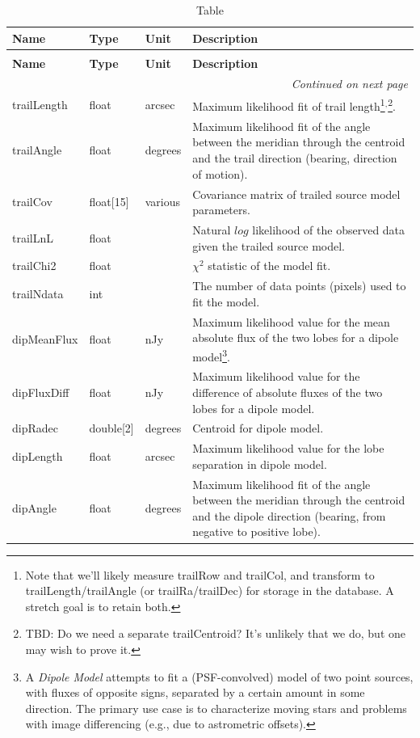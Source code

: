 \documentclass[SE,lsstdraft,toc]{lsstdoc}
\newenvironment{schema}[3]{%
\setlength\LTleft{0pt}
\setlength\LTright{\fill}
\begin{longtable}{p{0.2\textwidth}p{0.14\textwidth}p{0.14\textwidth}p{0.41\textwidth}}

\caption[#1]{#2\label{#3}}\\

\hline \textbf{Name} & \textbf{Type} & \textbf{Unit} & \textbf{Description}\\ \hline
\endfirsthead

\caption[#1]{#2}\\

\hline \textbf{Name} & \textbf{Type} & \textbf{Unit} & \textbf{Description}\\ \hline
\endhead

\hline \multicolumn{4}{r}{\emph{Continued on next page}} \\
\endfoot

\hline\hline
\endlastfoot
}{%
\hline
\end{longtable}
}
\begin{document}
\begin{schema}{\DIASource Table}{\DIASource Table}{tbl:diasourceTable}
trailLength & float & arcsec & Maximum likelihood fit of trail length\footnote{Note that we'll likely measure trailRow and trailCol, and transform to trailLength/trailAngle (or trailRa/trailDec) for storage in the database. A stretch goal is to retain both.}$^,$\footnote{TBD: Do we need a separate trailCentroid? It's unlikely that we do, but one may wish to prove it.}. \\

trailAngle & float & degrees & Maximum likelihood fit of the angle between the meridian through the centroid and the trail direction (bearing, direction of motion). \\

trailCov & float[15] & various & Covariance matrix of trailed source model parameters. \\

trailLnL & float & ~ & Natural $log$ likelihood of the observed data given the trailed source model. \\

trailChi2 & float & ~ & $\chi^2$ statistic of the model fit. \\

trailNdata & int & ~ & The number of data points (pixels) used to fit the model. \\

dipMeanFlux & float & nJy & Maximum likelihood value for the mean absolute flux of the two lobes for a dipole model\footnote{A \emph{Dipole Model} attempts to fit a (PSF-convolved) model of two point sources, with fluxes
of opposite signs, separated by a certain amount in some direction. The primary use case is to characterize moving stars and problems with image differencing (e.g., due to astrometric offsets).}.
\\

dipFluxDiff & float & nJy & Maximum likelihood value for the difference of absolute fluxes of the two lobes for a dipole model.
\\

dipRadec & double[2] & degrees & Centroid for dipole model. \\

dipLength & float & arcsec & Maximum likelihood value for the lobe separation in dipole model. \\

dipAngle & float & degrees & Maximum likelihood fit of the angle between the meridian through the centroid and the dipole direction (bearing, from negative to positive lobe). \\


\end{schema}
\end{document}
